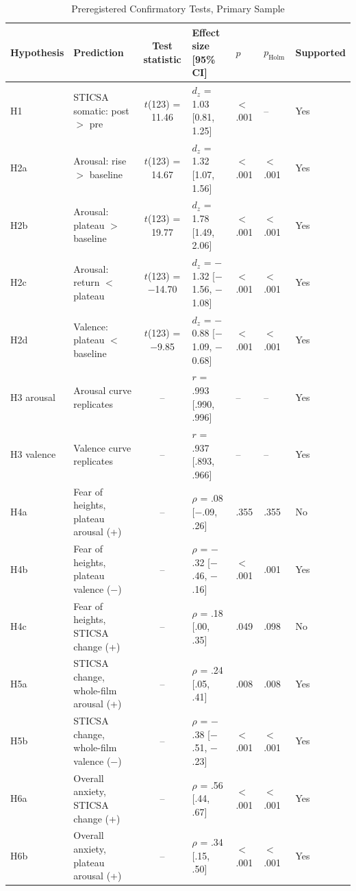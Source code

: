 \begin{table}[tbp]
\caption{Preregistered Confirmatory Tests, Primary Sample}
\label{tab:confirmatory}
\begin{threeparttable}
\footnotesize\linespread{1}\selectfont\setlength{\tabcolsep}{3.5pt}
\begin{tabular}{@{}l>{\raggedright\arraybackslash}p{3.0cm}cllll@{}}
\toprule
Hypothesis & Prediction & Test statistic & Effect size [95\% CI] & $p$ & $p_\mathrm{Holm}$ & Supported \\
\midrule
H1 & STICSA somatic: post $>$ pre & $t$(123) = 11.46 & $d_z$ = 1.03 [0.81, 1.25] & $<$ .001 & -- & Yes \\
\addlinespace
H2a & Arousal: rise $>$ baseline & $t$(123) = 14.67 & $d_z$ = 1.32 [1.07, 1.56] & $<$ .001 & $<$ .001 & Yes \\
H2b & Arousal: plateau $>$ baseline & $t$(123) = 19.77 & $d_z$ = 1.78 [1.49, 2.06] & $<$ .001 & $<$ .001 & Yes \\
H2c & Arousal: return $<$ plateau & $t$(123) = $-$14.70 & $d_z$ = $-$1.32 [$-$1.56, $-$1.08] & $<$ .001 & $<$ .001 & Yes \\
H2d & Valence: plateau $<$ baseline & $t$(123) = $-$9.85 & $d_z$ = $-$0.88 [$-$1.09, $-$0.68] & $<$ .001 & $<$ .001 & Yes \\
\addlinespace
H3 arousal & Arousal curve replicates & -- & $r$ = .993 [.990, .996] & -- & -- & Yes \\
H3 valence & Valence curve replicates & -- & $r$ = .937 [.893, .966] & -- & -- & Yes \\
\addlinespace
H4a & Fear of heights, plateau arousal (+) & -- & $\rho$ = .08 [$-$.09, .26] & .355 & .355 & No \\
H4b & Fear of heights, plateau valence ($-$) & -- & $\rho$ = $-$.32 [$-$.46, $-$.16] & $<$ .001 & .001 & Yes \\
H4c & Fear of heights, STICSA change (+) & -- & $\rho$ = .18 [.00, .35] & .049 & .098 & No \\
\addlinespace
H5a & STICSA change, whole-film arousal (+) & -- & $\rho$ = .24 [.05, .41] & .008 & .008 & Yes \\
H5b & STICSA change, whole-film valence ($-$) & -- & $\rho$ = $-$.38 [$-$.51, $-$.23] & $<$ .001 & $<$ .001 & Yes \\
\addlinespace
H6a & Overall anxiety, STICSA change (+) & -- & $\rho$ = .56 [.44, .67] & $<$ .001 & $<$ .001 & Yes \\
H6b & Overall anxiety, plateau arousal (+) & -- & $\rho$ = .34 [.15, .50] & $<$ .001 & $<$ .001 & Yes \\

\end{tabular}
\end{threeparttable}
\end{table}
